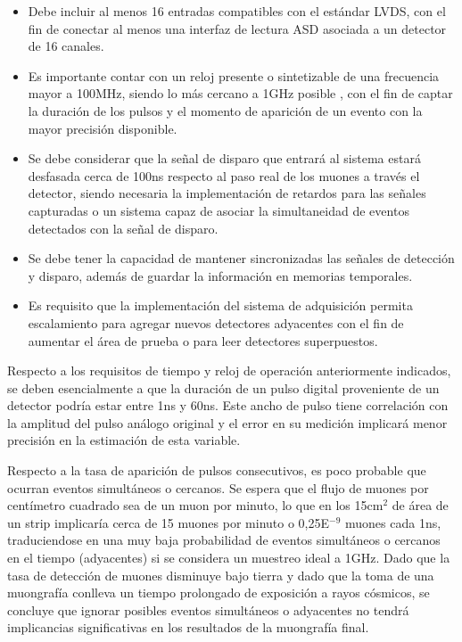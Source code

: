 \begin{itemize}
		\item Debe incluir al menos 16 entradas compatibles con el estándar LVDS, con el fin de conectar al menos una interfaz de lectura ASD asociada a un detector de 16 canales.
		\item Es importante contar con un reloj presente o sintetizable de una frecuencia mayor a 100MHz, siendo lo más cercano a 1GHz posible , con el fin de captar la duración de los pulsos y el momento de aparición de un evento con la mayor precisión disponible.
		\item Se debe considerar que la señal de disparo que entrará al sistema estará desfasada cerca de 100ns\cite{Oyanadel2020SistemaSTGC} respecto al paso real de los muones a través el detector, siendo necesaria la implementación de retardos para las señales capturadas o un sistema capaz de asociar la simultaneidad de eventos detectados con la señal de disparo.
		\item  Se debe tener la capacidad de mantener sincronizadas las señales de detección y disparo, además de guardar la información en memorias temporales.
		\item Es requisito que la implementación del sistema de adquisición permita escalamiento para agregar nuevos detectores adyacentes con el fin de aumentar el área de prueba o para leer detectores superpuestos.
	\end{itemize}
	
	Respecto a los requisitos de tiempo y reloj de operación anteriormente indicados, se deben esencialmente a que la duración de un pulso digital proveniente de un detector podría estar entre 1ns y 60ns\cite{1999ATLASICs}. Este ancho de pulso tiene correlación con la amplitud del pulso análogo original y el error en su medición implicará menor precisión en la estimación de esta variable. 
	
	Respecto a la tasa de aparición de pulsos consecutivos, es poco probable que ocurran eventos simultáneos o cercanos. Se espera que el flujo de muones por centímetro cuadrado sea de un muon por minuto\cite{Rocca2018CosmicUs}, lo que en los 15cm$^2$ de área de un strip implicaría cerca de 15 muones por minuto o 0,25E$^{-9}$ muones cada 1ns, traduciendose en una muy baja probabilidad de eventos simultáneos o cercanos en el tiempo (adyacentes) si se considera un muestreo ideal a 1GHz. Dado que la tasa de detección de muones disminuye bajo tierra y dado que la toma de una muongrafía conlleva un tiempo prolongado de exposición a rayos cósmicos, se concluye que ignorar posibles eventos simultáneos o adyacentes no tendrá implicancias significativas en los resultados de la muongrafía final. 

